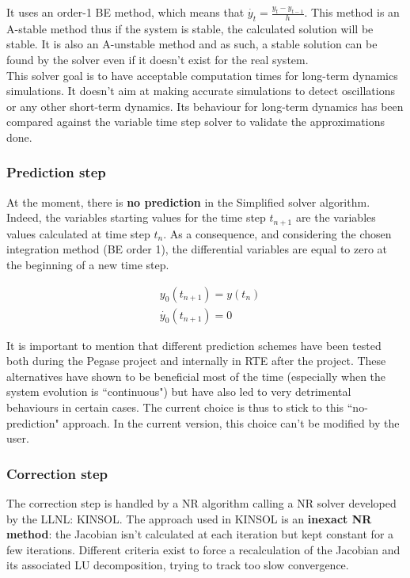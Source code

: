 \documentclass[a4paper, 12pt]{report}
\begin{document}
It uses an order-1 \ac{BE} method, which means that $\dot{y_t} = \frac{y_t - y_{t-1}}{h}$. This method is an A-stable method thus if the system is stable, the calculated solution will be stable. It is also an A-unstable method and as such, a stable solution can be found by the solver even if it doesn't exist for the real system. \\

This solver goal is to have acceptable computation times for long-term dynamics simulations. It doesn't aim at making accurate simulations to detect oscillations or any other short-term dynamics. Its behaviour for long-term dynamics has been compared against the variable time step solver to validate the approximations done. \\

\subsubsection{Prediction step}

At the moment, there is \textbf{no prediction} in the Simplified solver  algorithm. Indeed, the variables starting values for the time step $t_{n+1}$ are the variables values calculated at time step $t_n$. As a consequence, and considering the chosen integration method (\ac{BE} order 1), the differential variables are equal to zero at the beginning of a new time step.

\begin{equation}
\begin{aligned}
& y_0(t_{n+1}) = y(t_n) \\
& \dot{y_0}(t_{n+1}) = 0
\end{aligned}
\end{equation}

It is important to mention that different prediction schemes have been tested both during the Pegase project and internally in RTE after the project. These alternatives have shown to be beneficial most of the time (especially when the system evolution is ``continuous") but have also led to very detrimental behaviours in certain cases. The current choice is thus to stick to this ``no-prediction" approach. In the current version, this choice can't be modified by the user.

\subsubsection{Correction step}

The correction step is handled by a \ac{NR} algorithm calling a \ac{NR} solver developed by the \ac{LLNL}: \ac{KINSOL}. The approach used in \ac{KINSOL} is an \textbf{inexact \ac{NR} method}: the Jacobian isn't calculated at each iteration but kept constant for a few iterations. Different criteria exist to force a recalculation of the Jacobian and its associated LU decomposition, trying to track too slow convergence.
\end{document}
